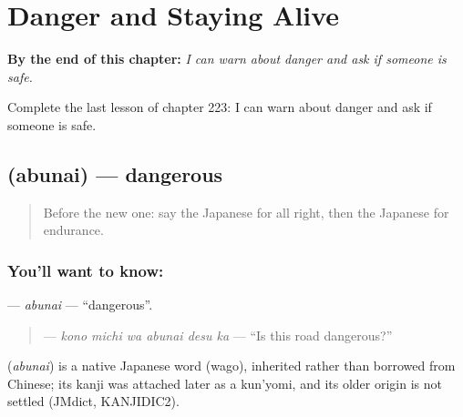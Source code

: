 
\chapter{Danger and Staying Alive}
\label{ch:ja-danger-and-staying-alive}

\begin{chapteropening}
\textbf{By the end of this chapter:} \emph{I can warn about danger and ask if someone is safe.}

Complete the last lesson of chapter 223: I can warn about danger and ask if someone is safe.
\end{chapteropening}

\section[\texorpdfstring{\ja{あぶない} (abunai)}{あぶない (abunai)}]{ (abunai) — dangerous}

\label{lesson:JA-C223-abunai}



\begin{quote}
Before the new one: say the Japanese for all right, then the Japanese for endurance.
\end{quote}

\subsection*{You'll want to know: }
\textbf{} — \emph{abunai} — \textquotedblleft{}dangerous\textquotedblright{}.

\begin{quote}
\textbf{  } — \emph{kono michi wa abunai desu ka} — \textquotedblleft{}Is this road dangerous?\textquotedblright{}
\end{quote}

\begin{cousinweb}
\textbf{} (\emph{abunai}) is a native Japanese word (wago), inherited rather than borrowed from Chinese; its kanji was attached later as a kun'yomi, and its older origin is not settled (JMdict, KANJIDIC2).
\end{cousinweb}

